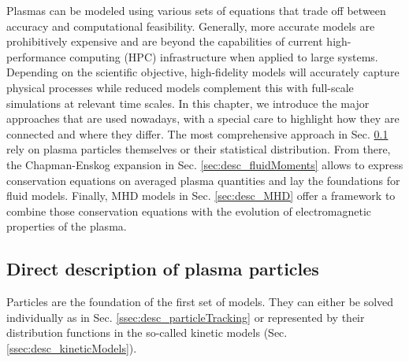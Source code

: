 Plasmas can be modeled using various sets of equations that trade off between accuracy and computational feasibility. Generally, more accurate models are prohibitively expensive and are beyond the capabilities of current high-performance computing (HPC) infrastructure when applied to large systems. Depending on the scientific objective, high-fidelity models will accurately capture physical processes while reduced models complement this with full-scale simulations at relevant time scales. In this chapter, we introduce the major approaches that are used nowadays, with a special care to highlight how they are connected and where they differ. The most comprehensive approach in Sec. \ref{sec:desc_directDesciption} rely on plasma particles themselves or their statistical distribution. From there, the Chapman-Enskog expansion in Sec. \ref{sec:desc_fluidMoments} allows to express conservation equations on averaged plasma quantities and lay the foundations for fluid models. Finally, MHD models in Sec. \ref{sec:desc_MHD} offer a framework to combine those conservation equations with the evolution of electromagnetic properties of the plasma. 

\subsection{Direct description of plasma particles}
\label{sec:desc_directDesciption}
Particles are the foundation of the first set of models. They can either be solved individually as in Sec. \ref{ssec:desc_particleTracking} or represented by their distribution functions in the so-called kinetic models (Sec. \ref{ssec:desc_kineticModels}).


